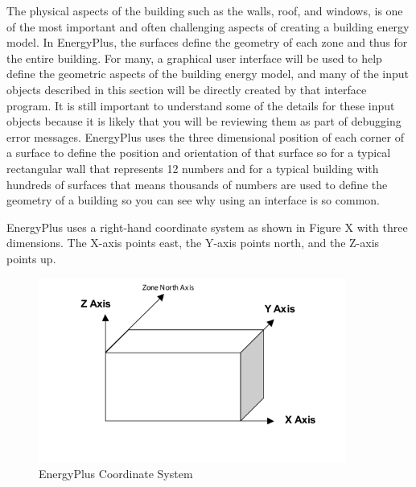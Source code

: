 The physical aspects of the building such as the walls, roof, and
windows, is one of the most important and often challenging aspects
of creating a building energy model. In EnergyPlus, the surfaces define
the geometry of each zone and thus for the entire building. For many,
a graphical user interface will be used to help define the geometric
aspects of the building energy model, and many of the input objects
described in this section will be directly created by that interface
program. It is still important to understand some of the details for
these input objects because it is likely that you will be reviewing
them as part of debugging error messages. EnergyPlus uses the three
dimensional position of each corner of a surface to define the position
and orientation of that surface so for a typical rectangular wall
that represents 12 numbers and for a typical building with hundreds
of surfaces that means thousands of numbers are used to define the
geometry of a building so you can see why using an interface is so
common.

EnergyPlus uses a right-hand coordinate system as shown in Figure
X with three dimensions. The X-axis points east, the Y-axis points
north, and the Z-axis points up.

\begin{figure}[hbtp] 
\centering
\includegraphics[width=0.9\textwidth, height=0.9\textheight, keepaspectratio=true]{media/coordinatesystem.png}
\caption{EnergyPlus Coordinate System}
\end{figure}

